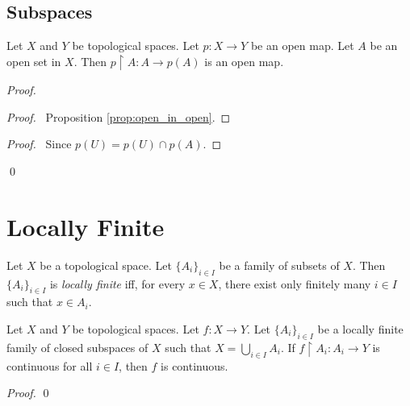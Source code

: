 \subsection{Subspaces}

\begin{prop}
Let $X$ and $Y$ be topological spaces. Let $p : X \rightarrow Y$ be an open map. Let $A$ be an open set in $X$. Then $p \restriction A : A \rightarrow p(A)$ is an open map.
\end{prop}

\begin{proof}
\pf
{}
\begin{proof}
	\pf\ Proposition \ref{prop:open_in_open}.
\end{proof}
\begin{proof}
	\pf\ Since $p(U) = p(U) \cap p(A)$.
\end{proof}
\qed
\end{proof}

\section{Locally Finite}

\begin{df}
Let $X$ be a topological space. Let $\{A_i\}_{i \in I}$ be a family of subsets of $X$. Then $\{A_i\}_{i \in I}$ is \emph{locally finite} iff, for every $x \in X$, there exist only finitely many $i \in I$ such that $x \in A_i$.
\end{df}

\begin{thm}
Let $X$ and $Y$ be topological spaces. Let $f : X \rightarrow Y$. Let $\{A_i\}_{i \in I}$ be a locally finite family of closed subspaces of $X$ such that $X = \bigcup_{i \in I} A_i$. If $f \restriction A_i : A_i \rightarrow Y$ is continuous for all $i \in I$, then $f$ is continuous.
\end{thm}

\begin{proof}
\pf
{}
\qed
\end{proof}

